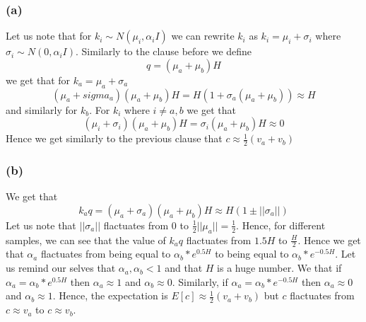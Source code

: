 \subsubsection*{(a)}
Let us note that for $k_i \sim N(\mu_i, \alpha_i I)$ we can rewrite $k_i$ as $k_i = \mu_i + \sigma_i$ where $\sigma_i \sim N(0, \alpha_i I)$. Similarly to the clause before we define
$$q=(\mu_a+\mu_b)H$$
we get that for $k_a=\mu_a+\sigma_a$
$$(\mu_a+sigma_a)(\mu_a+\mu_b)H=H(1+\sigma_a(\mu_a+\mu_b)) \approx H$$
and similarly for $k_b$. For $k_i$ where $i \neq a,b$ we get that
\[(\mu_i+\sigma_i)(\mu_a+\mu_b)H=\sigma_i(\mu_a+\mu_b)H \approx 0\]
Hence we get similarly to the previous clause that $c \approx \frac{1}{2}(v_a+v_b)$
\subsubsection*{(b)}
We get that 
$$k_a q = (\mu_a+\sigma_a)(\mu_a+\mu_b)H \approx H(1 \pm ||\sigma_a||)$$
Let us note that $||\sigma_a||$ flactuates from $0$ to $\frac{1}{2} ||\mu_a||=\frac{1}{2}$. \newline    
Hence, for different samples, we can see that the value of $k_a q$ flactuates from $1.5H$ to $\frac{H}{2}$. Hence we get that $\alpha_a$ flactuates from being equal to $\alpha_b * e^{0.5H}$ to being equal to $\alpha_b * e^{-0.5H}$. \newline
Let us remind our selves that $\alpha_a, \alpha_b < 1$ and that $H$ is a huge number. We that if $\alpha_a = \alpha_b * e^{0.5H}$ then $\alpha_a \approx 1$ and $\alpha_b \approx 0$. Similarly, if $\alpha_a = \alpha_b * e^{-0.5H}$ then $\alpha_a \approx 0$ and $\alpha_b \approx 1$. \newline
Hence, the expectation is $E[c] \approx \frac{1}{2}(v_a + v_b)$ but $c$ flactuates from $c \approx v_a$ to $c \approx v_b$.